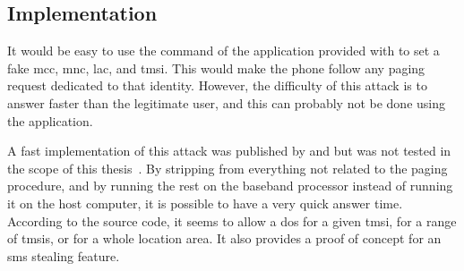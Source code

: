       \subsection{Implementation}

      It would be easy to use the  command of the
       application provided with  to set a
      fake \gls{mcc}, \gls{mnc}, \gls{lac}, and \gls{tmsi}. This would
      make the phone follow any paging request dedicated to that
      identity. However, the difficulty of this attack is to answer
      faster than the legitimate user, and this can probably not be done
      using the  application.
      
      A fast implementation of this attack was published by  and  but was not tested in the scope of
      this thesis~\cite{golde_paging_2013, golde_let_2013-1}.  By
      stripping  from everything not related to the
      paging procedure, and by running the rest on the baseband
      processor instead of running it on the host computer, it is
      possible to have a very quick answer time. According to the source
      code, it seems to allow a \gls{dos} for a given \gls{tmsi}, for a
      range of \glspl{tmsi}, or for a whole location area. It also
      provides a proof of concept for an \gls{sms} stealing feature.


      \iffalse
      https://www.troopers.de/wp-content/uploads/2012/12/TROOPERS13-Attacking_mobile-terminated_services_in_GSM-Nico_Golde.pdf
      http://users.sec.t-labs.tu-berlin.de/~nico/fun_with_paging_4f0acac4c1fa538082f54cb14bef0841aa9c8abb.diff
      https://tinyurl.com/fun-with-paging

      (Uncleaned) source code available:
      http://tinyurl.com/fun-with-paging
      
      Apply on osmocom changeset 
      4f0acac4c1fa538082f54cb14bef0841aa9c8abb
      \fi
